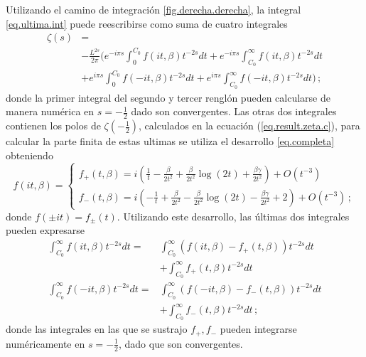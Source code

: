 Utilizando el camino de integración \ref{fig.derecha.derecha}, la integral \ref{eq.ultima.int} puede reescribirse como suma de cuatro integrales
\begin{align}
\label{eq.zeta.completa.2}
	\zeta (s) 
&	
	= 
\\
\nonumber
&
- \frac{L ^{2s}}{2 \pi } 
\Bigg(	  e ^{- i \pi s} \int _0 ^{C _0}
			f (i t,\beta )
			t ^{-2s}  dt 
		+ e ^{- i \pi s} \int _{C _0} ^{\infty}
			f (i t,\beta )
			t ^{-2s}  dt 
\\
\nonumber
&
		+ e ^{i \pi s} \int _{0} ^{C _0} 
			f (-i t,\beta )
			t ^{-2s}  dt 
		+ e ^{i \pi s} \int _{C _0} ^{\infty}
			f (-i t,\beta )
			t ^{-2s}  dt 
	\Bigg)
\, ;
\end{align}
donde la primer integral del segundo y tercer renglón pueden calcularse de manera numérica en $s= -\frac{1}{2}$ dado son convergentes. Las otras dos integrales contienen los polos de $\zeta \left(- \frac{1}{2} \right)$, calculados en la ecuación (\ref{eq.result.zeta.c}), para calcular la parte finita de estas ultimas se utiliza el desarrollo \eqref{eq.completa} obteniendo
\[ 
f   ( i t ,\beta )=
\begin{cases} 
	  f _{+} ( t, \beta) = 
	  i  \left(
			\frac{1}{t} - \frac{\beta}{2 t ^2 } + \frac{\beta}{2 t^2}
			\log (2 t) + \frac{\beta \gamma}{2 t^2} 
			\right) + O (t ^{-3})
\\
	  f _{-} ( t, \beta) =
      i  \left(
			- \frac{1}{t} + \frac{\beta}{2 t ^2 } - \frac{\beta}{2 t^2}
			\log (2 t) - \frac{\beta \gamma}{2 t^2} +2
			\right) + O (t ^{-3}) \, ;
   \end{cases}   
\] 
donde $f (\pm i t ) = f _{\pm} (t) $.
Utilizando este desarrollo, las últimas dos integrales pueden expresarse
\begin{align}
\nonumber
	\int _{C _0} ^{\infty}
			f (i t,\beta )
			t ^{-2s}  dt =& 
	\int _{C _0} ^{\infty}
		\left(
			f (it, \beta) - f _{+} (t, \beta )			
				\right) t ^{-2s} dt 
\label{eq.arriba1}
\\ &+ 
	\int _{C _0} ^{\infty}
			f _{+} ( t, \beta)
			 t ^{-2s} dt  \\
\nonumber
	\int _{C _0} ^{\infty}
			f (-i t,\beta )
			t ^{-2s}  dt 
=& 
	\int _{C _0} ^{\infty}
		\left(
			f (-it, \beta) - f _{-} (t, \beta )			
				\right) t ^{-2s} dt 
	\\ &+ 
\label{eq.arriba2}
	\int _{C _0} ^{\infty}
			f _{-} ( t, \beta)
			 t ^{-2s} dt
\, ;
\end{align}
donde las integrales en las que se sustrajo $f _{+},f_ {-}$ pueden integrarse numéricamente en $s=- \frac{1}{2}$, dado que son convergentes. 
